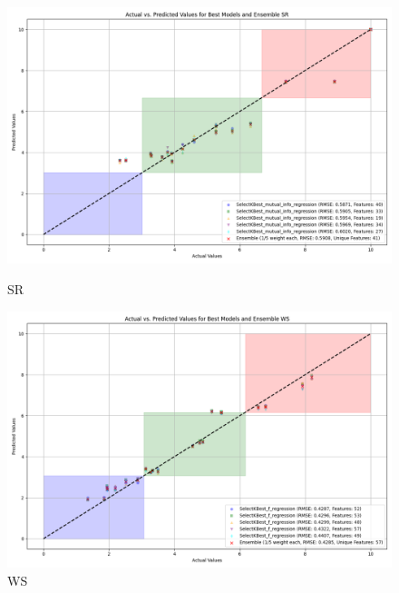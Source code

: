 \begin{figure}[H]
    \centering
    \begin{minipage}{0.45\textwidth}
        \centering
        \includegraphics[width=\linewidth]{reg_section_all/images_reg_featred_ensemble/actual_vs_predicted_best_feature_selection_and_ensemble_SR.png}
        \caption{SR}
        \label{fig:sr_reg_featred_best_ensemble}
    \end{minipage}\hfill
    \begin{minipage}{0.45\textwidth}
        \centering
        \includegraphics[width=\linewidth]{reg_section_all/images_reg_featred_ensemble/actual_vs_predicted_best_feature_selection_and_ensemble_WS.png}
        \caption{WS}
        \label{fig:ws_reg_featred_best_ensemble}
    \end{minipage}
\end{figure}

